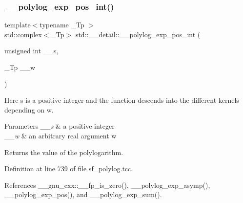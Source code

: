\mbox{\label{namespacestd_1_1____detail_a6d05f9213f03b1781250cc048739e55b}} 
\subsubsection{\texorpdfstring{\+\_\+\+\_\+polylog\+\_\+exp\+\_\+pos\+\_\+int()}{\_\_polylog\_exp\_pos\_int()}\hspace{0.1cm}{\footnotesize\ttfamily [2/2]}}
{\footnotesize\ttfamily template$<$typename \+\_\+\+Tp $>$ \\
std\+::complex$<$\+\_\+\+Tp$>$ std\+::\+\_\+\+\_\+detail\+::\+\_\+\+\_\+polylog\+\_\+exp\+\_\+pos\+\_\+int (\begin{DoxyParamCaption}\item[{unsigned int}]{\+\_\+\+\_\+s,  }\item[{\+\_\+\+Tp}]{\+\_\+\+\_\+w }\end{DoxyParamCaption})}

Here s is a positive integer and the function descends into the different kernels depending on w.


\begin{DoxyParams}{Parameters}
{\em \+\_\+\+\_\+s} & a positive integer \\
\hline
{\em \+\_\+\+\_\+w} & an arbitrary real argument w \\
\hline
\end{DoxyParams}
\begin{DoxyReturn}{Returns}
the value of the polylogarithm. 
\end{DoxyReturn}


Definition at line 739 of file sf\+\_\+polylog.\+tcc.



References \+\_\+\+\_\+gnu\+\_\+cxx\+::\+\_\+\+\_\+fp\+\_\+is\+\_\+zero(), \+\_\+\+\_\+polylog\+\_\+exp\+\_\+asymp(), \+\_\+\+\_\+polylog\+\_\+exp\+\_\+pos(), and \+\_\+\+\_\+polylog\+\_\+exp\+\_\+sum().

\mbox{\label{namespacestd_1_1____detail_a36da38ab2aa8a67c089412937d5a695b}} 

